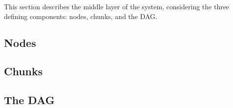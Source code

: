 This section describes the middle layer of the system, considering the three defining components: nodes, chunks, and the DAG.

\subsection{Nodes}\label{sec:nodes}

\subsection{Chunks}

\subsection{The DAG}\label{sec:dag}

